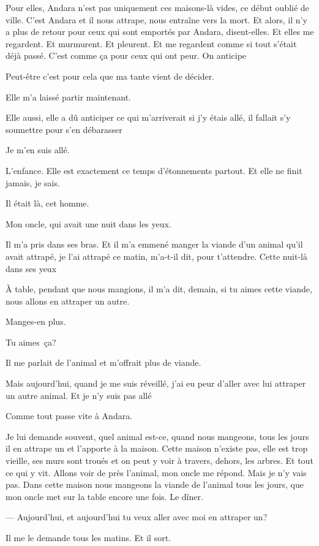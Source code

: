 Pour elles, Andara n'est pas uniquement ces maisons-là vides, ce début
oublié de ville. C'est Andara et il nous attrape, nous entraîne vers la
mort. Et alors, il n'y a plus de retour pour ceux qui sont emportés par
Andara, disent-elles. Et elles me regardent. Et murmurent. Et pleurent.
Et me regardent comme si tout s'était déjà passé. C'est comme ça pour
ceux qui ont peur. On anticipe

Peut-être c'est pour cela que ma tante vient de décider.

Elle m'a laissé partir maintenant.

Elle aussi, elle a dû anticiper ce qui m'arriverait si j'y étais allé,
il fallait s'y soumettre pour s'en débarasser

Je m'en suis allé.

L'enfance. Elle est exactement ce temps d'étonnements partout. Et elle
ne finit jamais, je sais.

Il était là, cet homme.

Mon oncle, qui avait une nuit dans les yeux.

Il m'a pris dans ses bras. Et il m'a emmené manger la viande d'un animal
qu'il avait attrapé, je l'ai attrapé ce matin, m'a-t-il dit, pour
t'attendre. Cette nuit-là dans ses yeux

À table, pendant que nous mangions, il m'a dit, demain, si tu aimes
cette viande, nous allons en attraper un autre.

Manges-en plus.

Tu aimes~ça?

Il me parlait de l'animal et m'offrait plus de viande.

Mais aujourd'hui, quand je me suis réveillé, j'ai eu peur d'aller avec
lui attraper un autre animal. Et je n'y suis pas allé

Comme tout passe vite à Andara.

Je lui demande souvent, quel animal est-ce, quand nous mangeons, tous
les jours il en attrape un et l'apporte à la maison. Cette maison
n'existe pas, elle est trop vieille, ses murs sont troués et on peut y
voir à travers, dehors, les arbres. Et tout ce qui y vit. Allons voir de
près l'animal, mon oncle me répond. Mais je n'y vais pas. Dans cette
maison nous mangeons la viande de l'animal tous les jours, que mon oncle
met sur la table encore une fois. Le dîner.

--- Aujourd'hui, et aujourd'hui tu veux aller avec moi en attraper un?

Il me le demande tous les matins. Et il sort.

